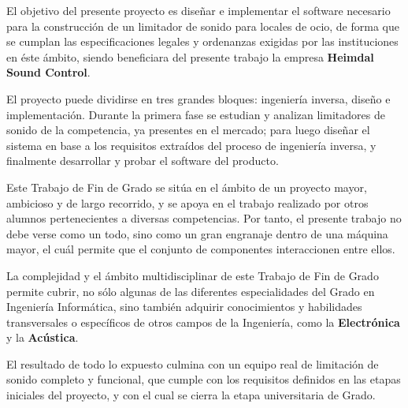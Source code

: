 \begin{singlespace}

    \noindent El objetivo del presente proyecto es diseñar e implementar el software necesario para la construcción de un limitador de sonido para locales de ocio, de forma que se cumplan las especificaciones legales y ordenanzas exigidas por las instituciones en éste ámbito, siendo beneficiara del presente trabajo la empresa \textbf{Heimdal Sound Control}.

    \noindent El proyecto puede dividirse en tres grandes bloques: ingeniería inversa, diseño e implementación. Durante la primera fase se estudian y analizan limitadores de sonido de la competencia, ya presentes en el mercado; para luego diseñar el sistema en base a los requisitos extraídos del proceso de ingeniería inversa, y finalmente desarrollar y probar el software del producto.

    \noindent Este Trabajo de Fin de Grado se sitúa en el ámbito de un proyecto mayor, ambicioso y de largo recorrido, y se apoya en el trabajo realizado por otros alumnos pertenecientes a diversas competencias. Por tanto, el presente trabajo no debe verse como un todo, sino como un gran engranaje dentro de una máquina mayor, el cuál permite que el conjunto de componentes interaccionen entre ellos.

    \noindent La complejidad y el ámbito multidisciplinar de este Trabajo de Fin de Grado permite cubrir, no sólo algunas de las diferentes especialidades del Grado en Ingeniería Informática, sino también adquirir conocimientos y habilidades transversales o específicos de otros campos de la Ingeniería, como la \textbf{Electrónica} y la \textbf{Acústica}.

    \noindent El resultado de todo lo expuesto culmina con un equipo real de limitación de sonido completo y funcional, que cumple con los requisitos definidos en las etapas iniciales del proyecto, y con el cual se cierra la etapa universitaria de Grado.


\end{singlespace}
